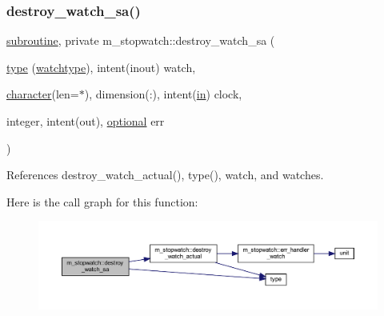 \subsubsection{\texorpdfstring{destroy\+\_\+watch\+\_\+sa()}{destroy\_watch\_sa()}}
{\footnotesize\ttfamily \hyperlink{M__stopwatch_83_8txt_acfbcff50169d691ff02d4a123ed70482}{subroutine}, private m\+\_\+stopwatch\+::destroy\+\_\+watch\+\_\+sa (\begin{DoxyParamCaption}\item[{\hyperlink{stop__watch_83_8txt_a70f0ead91c32e25323c03265aa302c1c}{type} (\hyperlink{structm__stopwatch_1_1watchtype}{watchtype}), intent(inout)}]{watch,  }\item[{\hyperlink{option__stopwatch_83_8txt_abd4b21fbbd175834027b5224bfe97e66}{character}(len=$\ast$), dimension(\+:), intent(\hyperlink{M__journal_83_8txt_afce72651d1eed785a2132bee863b2f38}{in})}]{clock,  }\item[{integer, intent(out), \hyperlink{option__stopwatch_83_8txt_aa4ece75e7acf58a4843f70fe18c3ade5}{optional}}]{err }\end{DoxyParamCaption})\hspace{0.3cm}{\ttfamily [private]}}



References destroy\+\_\+watch\+\_\+actual(), type(), watch, and watches.

Here is the call graph for this function\+:
\nopagebreak
\begin{figure}[H]
\begin{center}
\leavevmode
\includegraphics[width=350pt]{namespacem__stopwatch_a56c7eb5332f1d56b46bfc9a3a9b10134_cgraph}
\end{center}
\end{figure}
\mbox{\label{namespacem__stopwatch_a52d004e036a839d4513629cc4cb158c7}} 
